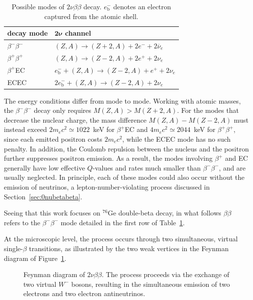 \begin{table}[H]
    \centering
    \begin{tabular}{ll}
        \toprule
        \textbf{decay mode} & $\boldsymbol{2\nu}$ \textbf{channel} \\
        \midrule
        $\beta^-\beta^-$ & $(Z,A) \to (Z+2,A) + 2e^- + 2\overline{\nu}_e$ \\
        $\beta^+\beta^+$ & $(Z,A) \to (Z-2,A) + 2e^+ + 2\nu_e$ \\
        $\beta^+$\ac{EC} & $e^-_\text{b} + (Z,A) \to (Z-2,A) + e^+ + 2\nu_e$ \\
        \ac{EC}\ac{EC} & $2e^-_\text{b} + (Z,A) \to (Z-2,A) + 2\nu_e$ \\
        \bottomrule
    \end{tabular}
    \caption{Possible modes of $2\nu\beta\beta$ decay. $e^-_\text{b}$ denotes an electron captured from the atomic shell.}
    \label{tab:bb-modes}
\end{table}

The energy conditions differ from mode to mode. Working with atomic masses, the $\beta^-\beta^-$ decay only requires $M(Z,A) > M(Z+2,A)$. For the modes that decrease the nuclear charge, the mass difference $M(Z,A) - M(Z-2,A)$ must instead exceed $2m_ec^2 \simeq 1022$~keV for $\beta^+$\ac{EC} and $4m_ec^2 \simeq 2044$~keV for $\beta^+\beta^+$, since each emitted positron costs $2m_ec^2$, while the \ac{EC}\ac{EC} mode has no such penalty. In addition, the Coulomb repulsion between the nucleus and the positron further suppresses positron emission. As a result, the modes involving $\beta^+$ and \ac{EC} generally have low effective $Q$-values and rates much smaller than $\beta^-\beta^-$, and are usually neglected. In principle, each of these modes could also occur without the emission of neutrinos, a lepton-number-violating process discussed in Section~\ref{sec:0nubetabeta}. 

Seeing that this work focuses on ${}^{76}$Ge double-beta decay, in what follows $\beta\beta$ refers to the $\beta^-\beta^-$ mode detailed in the first row of Table~\ref{tab:bb-modes}.

At the microscopic level, the process occurs through two simultaneous, virtual single-$\beta$ transitions, as illustrated by the two weak vertices in the Feynman diagram of Figure~\ref{fig:2nu_feynman}.

\begin{figure}[H]
    \centering
    
    \caption{Feynman diagram of $2\nu\beta\beta$. The process proceeds via the exchange of two virtual $W^-$ bosons, resulting in the simultaneous emission of two electrons and two electron antineutrinos.}
    \label{fig:2nu_feynman}
\end{figure}

